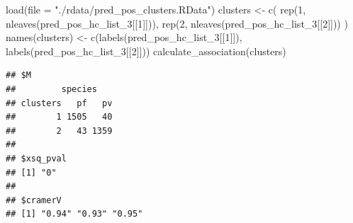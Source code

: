 \documentclass[
  11pt,
  oneside]{book}
\newenvironment{Shaded}{\begin{snugshade}}{\end{snugshade}}
\newcommand{\AttributeTok}[1]{\textcolor[rgb]{0.77,0.63,0.00}{#1}}
\newcommand{\DecValTok}[1]{\textcolor[rgb]{0.00,0.00,0.81}{#1}}
\newcommand{\FunctionTok}[1]{\textcolor[rgb]{0.00,0.00,0.00}{#1}}
\newcommand{\NormalTok}[1]{#1}
\newcommand{\OtherTok}[1]{\textcolor[rgb]{0.56,0.35,0.01}{#1}}
\newcommand{\StringTok}[1]{\textcolor[rgb]{0.31,0.60,0.02}{#1}}
\begin{document}
\begin{Shaded}
\begin{Highlighting}[]
\FunctionTok{load}\NormalTok{(}\AttributeTok{file =} \StringTok{"./rdata/pred\_pos\_clusters.RData"}\NormalTok{)}
\NormalTok{clusters }\OtherTok{\textless{}{-}} \FunctionTok{c}\NormalTok{(}
  \FunctionTok{rep}\NormalTok{(}\DecValTok{1}\NormalTok{, }\FunctionTok{nleaves}\NormalTok{(pred\_pos\_hc\_list\_3[[}\DecValTok{1}\NormalTok{]])),}
  \FunctionTok{rep}\NormalTok{(}\DecValTok{2}\NormalTok{, }\FunctionTok{nleaves}\NormalTok{(pred\_pos\_hc\_list\_3[[}\DecValTok{2}\NormalTok{]]))}
\NormalTok{)}
\FunctionTok{names}\NormalTok{(clusters) }\OtherTok{\textless{}{-}} \FunctionTok{c}\NormalTok{(}\FunctionTok{labels}\NormalTok{(pred\_pos\_hc\_list\_3[[}\DecValTok{1}\NormalTok{]]), }\FunctionTok{labels}\NormalTok{(pred\_pos\_hc\_list\_3[[}\DecValTok{2}\NormalTok{]]))}
\FunctionTok{calculate\_association}\NormalTok{(clusters)}
\end{Highlighting}
\end{Shaded}

\begin{verbatim}
## $M
##         species
## clusters   pf   pv
##        1 1505   40
##        2   43 1359
## 
## $xsq_pval
## [1] "0"
## 
## $cramerV
## [1] "0.94" "0.93" "0.95"
\end{verbatim}
\end{document}
